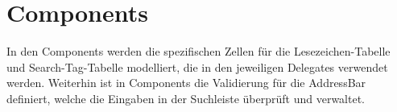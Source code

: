 
\section{Components}

In den Components werden die spezifischen Zellen für die Lesezeichen-Tabelle und Search-Tag-Tabelle modelliert, die in den jeweiligen Delegates verwendet werden. Weiterhin ist in Components die Validierung für die AddressBar definiert, welche die Eingaben in der Suchleiste überprüft und verwaltet.
